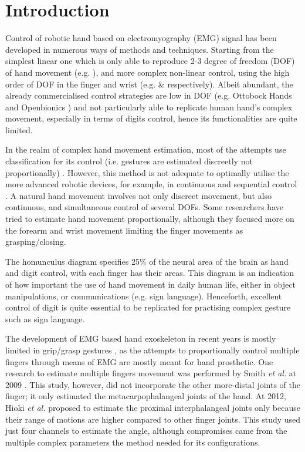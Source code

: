 \documentclass[conference]{IEEEtran}
\begin{document}
\section{Introduction}
Control of robotic hand based on electromyography (EMG) signal has been developed in numerous ways of methods and techniques. Starting from the simplest linear one which is only able to reproduce 2-3 degree of freedom (DOF) of hand movement (e.g. \cite{b1}), and more complex non-linear control, using the high order of DOF in the finger and wrist (e.g. \cite{b2} \& \cite{b3} respectively). Albeit abundant, the already commercialised control strategies are low in DOF (e.g. Ottobock Hands \cite{b4} and Openbionics \cite{b5}) and not particularly able to replicate human hand’s complex movement, especially in terms of digits control, hence its functionalities are quite limited.

In the realm of complex hand movement estimation, most of the attempts use classification for its 
control (i.e. gestures are estimated discreetly not proportionally) \cite{b4}\cite{b5}. However, this method is not 
adequate to optimally utilise the more advanced robotic devices, for example, in continuous and sequential 
control \cite{b8}. A natural hand movement involves not only discreet movement, but also continuous, and 
simultaneous control of several DOFs. Some researchers have tried to estimate hand movement 
proportionally, although they focused more on the forearm and wrist movement \cite{b3}\cite{b9} limiting the finger
movements as grasping/closing.

The homunculus diagram \cite{b10} specifies 25\% of the neural area of the brain as hand and digit control, 
with each finger has their areas. This diagram is an indication of how important the use of hand movement 
in daily human life, either in object manipulations, or communications (e.g. sign language). Henceforth, 
excellent control of digit is quite essential to be replicated for practising complex gesture such as sign 
language.

The development of EMG based hand exoskeleton in recent years is mostly limited in grip/grasp 
gestures \cite{b11}\cite{b12}\cite{b13}, as the attempts to proportionally control multiple fingers through means of EMG are 
mostly meant for hand prosthetic. One research to estimate multiple fingers movement was performed by 
Smith \textit{et al.} at 2009 \cite{b14}. This study, however, did not incorporate the other more-distal joints of the finger;
it only estimated the metacarpophalangeal joints of the hand. At 2012, Hioki \textit{et al.} \cite{b15} proposed to estimate 
the proximal interphalangeal joints only because their range of motions are higher compared to other finger 
joints. This study used just four channels to estimate the angle, although compromises came from the 
multiple complex parameters the method needed for its configurations.
\end{document}

